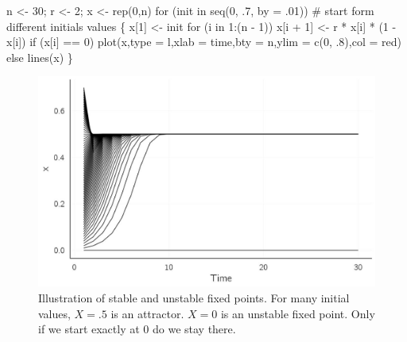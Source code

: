 \documentclass[
  a4paper,
  DIV=11,
  numbers=noendperiod]{scrreprt}
\newenvironment{Shaded}{\begin{snugshade}}{\end{snugshade}}
\newcommand{\AttributeTok}[1]{\textcolor[rgb]{0.40,0.45,0.13}{#1}}
\newcommand{\CommentTok}[1]{\textcolor[rgb]{0.37,0.37,0.37}{#1}}
\newcommand{\ControlFlowTok}[1]{\textcolor[rgb]{0.00,0.23,0.31}{#1}}
\newcommand{\DecValTok}[1]{\textcolor[rgb]{0.68,0.00,0.00}{#1}}
\newcommand{\FunctionTok}[1]{\textcolor[rgb]{0.28,0.35,0.67}{#1}}
\newcommand{\NormalTok}[1]{\textcolor[rgb]{0.00,0.23,0.31}{#1}}
\newcommand{\OtherTok}[1]{\textcolor[rgb]{0.00,0.23,0.31}{#1}}
\newcommand{\SpecialCharTok}[1]{\textcolor[rgb]{0.37,0.37,0.37}{#1}}
\newcommand{\StringTok}[1]{\textcolor[rgb]{0.13,0.47,0.30}{#1}}
\begin{document}
\begin{Shaded}
\begin{Highlighting}[]
\NormalTok{n }\OtherTok{\textless{}{-}} \DecValTok{30}\NormalTok{; r }\OtherTok{\textless{}{-}} \DecValTok{2}\NormalTok{; x }\OtherTok{\textless{}{-}} \FunctionTok{rep}\NormalTok{(}\DecValTok{0}\NormalTok{,n)}
\ControlFlowTok{for}\NormalTok{ (init }\ControlFlowTok{in} \FunctionTok{seq}\NormalTok{(}\DecValTok{0}\NormalTok{, .}\DecValTok{7}\NormalTok{, }\AttributeTok{by =}\NormalTok{ .}\DecValTok{01}\NormalTok{))}
  \CommentTok{\# start form different initials values}
\NormalTok{\{ }
\NormalTok{  x[}\DecValTok{1}\NormalTok{] }\OtherTok{\textless{}{-}}\NormalTok{ init}
  \ControlFlowTok{for}\NormalTok{ (i }\ControlFlowTok{in} \DecValTok{1}\SpecialCharTok{:}\NormalTok{(n }\SpecialCharTok{{-}} \DecValTok{1}\NormalTok{))}
\NormalTok{    x[i }\SpecialCharTok{+} \DecValTok{1}\NormalTok{] }\OtherTok{\textless{}{-}}\NormalTok{ r }\SpecialCharTok{*}\NormalTok{ x[i] }\SpecialCharTok{*}\NormalTok{ (}\DecValTok{1} \SpecialCharTok{{-}}\NormalTok{ x[i])}
  \ControlFlowTok{if}\NormalTok{ (x[i] }\SpecialCharTok{==} \DecValTok{0}\NormalTok{)}
    \FunctionTok{plot}\NormalTok{(x,}\AttributeTok{type =} \StringTok{\textquotesingle{}l\textquotesingle{}}\NormalTok{,}\AttributeTok{xlab =} \StringTok{\textquotesingle{}time\textquotesingle{}}\NormalTok{,}\AttributeTok{bty =} \StringTok{\textquotesingle{}n\textquotesingle{}}\NormalTok{,}\AttributeTok{ylim =} \FunctionTok{c}\NormalTok{(}\DecValTok{0}\NormalTok{, .}\DecValTok{8}\NormalTok{),}\AttributeTok{col =} \StringTok{\textquotesingle{}red\textquotesingle{}}\NormalTok{)}
  \ControlFlowTok{else}
    \FunctionTok{lines}\NormalTok{(x)}
\NormalTok{\}}
\end{Highlighting}
\end{Shaded}

\begin{figure}

{\centering \includegraphics{media/ch2/fig-ch2-img3.jpg}

}

\caption{\label{fig-ch2-img3}Illustration of stable and unstable fixed
points. For many initial values, \(X = .5\) is an attractor. \(X = 0\)
is an unstable fixed point. Only if we start exactly at 0 do we stay
there.}

\end{figure}
\end{document}
